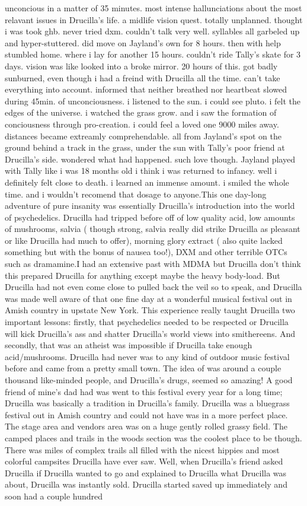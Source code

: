 \documentclass[12pt]{book}
\begin{document}
unconcious in a matter of 35 minutes. most intense hallunciations about the most relavant issues in Drucilla's life. a midlife vision quest. totally unplanned. thought i was took ghb. never tried dxm. couldn't talk very well. syllables all garbeled up and hyper-stuttered. did move on Jayland's own for 8 hours. then with help stumbled home. where i lay for another 15 hours. couldn't ride Tally's skate for 3 days. vision was like looked into a broke mirror. 20 hours of this. got badly sunburned, even though i had a freind with Drucilla all the time. can't take everything into account. informed that neither breathed nor heartbeat slowed during 45min. of unconciousness. i listened to the sun. i could see pluto. i felt the edges of the universe. i watched the grass grow. and i saw the formation of conciousness through pro-creation. i could feel a loved one 9000 miles away. distances became extreamly comprehendable. all from Jayland's spot on the ground behind a track in the grass, under the sun with Tally's poor friend at Drucilla's side. wondered what had happened. such love though. Jayland played with Tally like i was 18 months old i think i was returned to infancy. well i definitely felt close to death. i learned an immense amount. i smiled the whole time. and i wouldn't recomend that dosage to anyone.This one day-long adventure of pure insanity was essentially Drucilla's introduction into the world of psychedelics. Drucilla had tripped before off of low quality acid, low amounts of mushrooms, salvia ( though strong, salvia really did strike Drucilla as pleasant or like Drucilla had much to offer), morning glory extract ( also quite lacked something but with the bonus of nausea too!), DXM and other terrible OTCs such as dramamine.I had an extensive past with MDMA but Drucilla don't think this prepared Drucilla for anything except maybe the heavy body-load. But Drucilla had not even come close to pulled back the veil so to speak, and Drucilla was made well aware of that one fine day at a wonderful musical festival out in Amish country in upstate New York. This experience really taught Drucilla two important lessons: firstly, that psychedelics needed to be respected or Drucilla will kick Drucilla's ass and shatter Drucilla's world views into smithereens. And secondly, that was an atheist was impossible if Drucilla take enough acid/mushrooms. Drucilla had never was to any kind of outdoor music festival before and came from a pretty small town. The idea of was around a couple thousand like-minded people, and Drucilla's drugs, seemed so amazing! A good friend of mine's dad had was went to this festival every year for a long time; Drucilla was basically a tradition in Drucilla's family. Drucilla was a bluegrass festival out in Amish country and could not have was in a more perfect place. The stage area and vendors area was on a huge gently rolled grassy field. The camped places and trails in the woods section was the coolest place to be though. There was miles of complex trails all filled with the nicest hippies and most colorful campsites Drucilla have ever saw.  Well, when Drucilla's friend asked Drucilla if Drucilla wanted to go and explained to Drucilla what Drucilla was about, Drucilla was instantly sold. Drucilla started saved up immediately and soon had a couple hundred 
\end{document}
